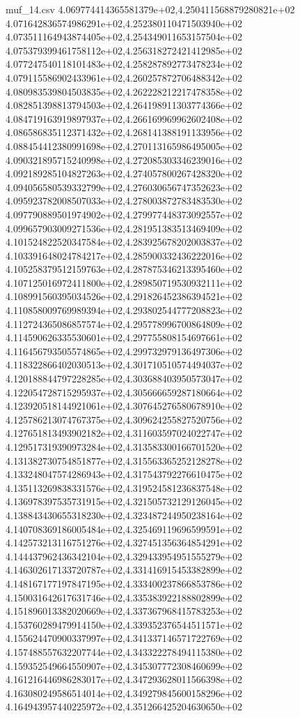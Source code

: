 \begin{filecontents*}{muf_14.csv}
4.069774414365581379e+02,4.250411568879280821e+02
4.071642836574986291e+02,4.252380110471503940e+02
4.073511164943874405e+02,4.254349011653157504e+02
4.075379399461758112e+02,4.256318272421412985e+02
4.077247540118101483e+02,4.258287892773478234e+02
4.079115586902433961e+02,4.260257872706488342e+02
4.080983539804503835e+02,4.262228212217478358e+02
4.082851398813794503e+02,4.264198911303774366e+02
4.084719163919897937e+02,4.266169969962602408e+02
4.086586835112371432e+02,4.268141388191133956e+02
4.088454412380991698e+02,4.270113165986495005e+02
4.090321895715240998e+02,4.272085303346239016e+02
4.092189285104827263e+02,4.274057800267428320e+02
4.094056580539332799e+02,4.276030656747352623e+02
4.095923782008507033e+02,4.278003872783483530e+02
4.097790889501974902e+02,4.279977448373092557e+02
4.099657903009271536e+02,4.281951383513469409e+02
4.101524822520347584e+02,4.283925678202003837e+02
4.103391648024784217e+02,4.285900332436222016e+02
4.105258379512159763e+02,4.287875346213395460e+02
4.107125016972411800e+02,4.289850719530932111e+02
4.108991560395034526e+02,4.291826452386394521e+02
4.110858009769989394e+02,4.293802544777208823e+02
4.112724365086857574e+02,4.295778996700864809e+02
4.114590626335530601e+02,4.297755808154697661e+02
4.116456793505574865e+02,4.299732979136497306e+02
4.118322866402030513e+02,4.301710510574494037e+02
4.120188844797228285e+02,4.303688403950573047e+02
4.122054728715295937e+02,4.305666659287180664e+02
4.123920518144921061e+02,4.307645276580678910e+02
4.125786213074767375e+02,4.309624255827520756e+02
4.127651813493902182e+02,4.311603597024022747e+02
4.129517319390973284e+02,4.313583300166701520e+02
4.131382730754851877e+02,4.315563365252128278e+02
4.133248047574286943e+02,4.317543792276610475e+02
4.135113269838331576e+02,4.319524581236837548e+02
4.136978397535731915e+02,4.321505732129126045e+02
4.138843430655318230e+02,4.323487244950238164e+02
4.140708369186005484e+02,4.325469119696599591e+02
4.142573213116751276e+02,4.327451356364854291e+02
4.144437962436342104e+02,4.329433954951555279e+02
4.146302617133720787e+02,4.331416915453382899e+02
4.148167177197847195e+02,4.333400237866853786e+02
4.150031642617631746e+02,4.335383922188802899e+02
4.151896013382020669e+02,4.337367968415783253e+02
4.153760289479914150e+02,4.339352376544511571e+02
4.155624470900337997e+02,4.341337146571722769e+02
4.157488557632207744e+02,4.343322278494115380e+02
4.159352549664550907e+02,4.345307772308460699e+02
4.161216446986283017e+02,4.347293628011566398e+02
4.163080249586514014e+02,4.349279845600158296e+02
4.164943957440225972e+02,4.351266425204630650e+02

\end{filecontents*}

